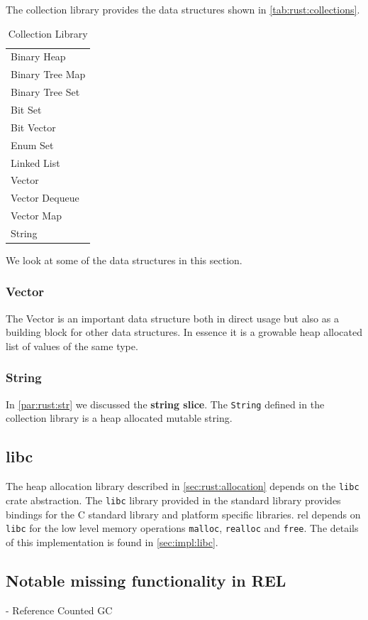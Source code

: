 The \rust collection library provides the data structures shown in \autoref{tab:rust:collections}.

\begin{table}[H]
  \begin{tabular}{l}
    Binary Heap \\
    Binary Tree Map \\
    Binary Tree Set \\
    Bit Set \\
    Bit Vector \\
    Enum Set \\
    Linked List \\
    Vector \\
    Vector Dequeue \\
    Vector Map \\
    String \\
  \end{tabular}
  \caption{\rust Collection Library}
  \label{tab:rust:collections}
\end{table}

We look at some of the data structures in this section.

\subsubsection{Vector}

The Vector is an important data structure both in direct usage but also as a building block for other data structures.
In essence it is a growable heap allocated list of values of the same type.

\subsubsection{String}

In \autoref{par:rust:str} we discussed the \textbf{string slice}.
The \texttt{String} defined in the collection library is a heap allocated mutable string.

\subsection{libc}

The heap allocation library described in \autoref{sec:rust:allocation} depends on the \texttt{libc} crate abstraction.
The \texttt{libc} library provided in the standard library provides bindings for the C standard library and platform specific libraries.
\gls{rel} depends on \texttt{libc} for the low level memory operations \texttt{malloc}, \texttt{realloc} and \texttt{free}.
The details of this implementation is found in \autoref{sec:impl:libc}. 

\subsection{Notable missing functionality in REL}

- Reference Counted GC

